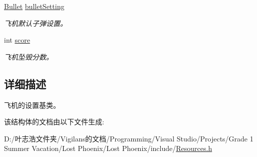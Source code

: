 \begin{DoxyCompactItemize}
\mbox{\label{struct_settings_1_1_plane_a8416c74c0910b4c7a9da8d633e0c346a}} 
\hyperlink{struct_settings_1_1_bullet}{Bullet} \hyperlink{struct_settings_1_1_plane_a8416c74c0910b4c7a9da8d633e0c346a}{bullet\+Setting}
\begin{DoxyCompactList}\small\item\em 飞机默认子弹设置。 \end{DoxyCompactList}\item 
\mbox{\label{struct_settings_1_1_plane_a20a8861d723406f4d49610804226dd82}} 
int \hyperlink{struct_settings_1_1_plane_a20a8861d723406f4d49610804226dd82}{score}
\begin{DoxyCompactList}\small\item\em 飞机坠毁分数。 \end{DoxyCompactList}\end{DoxyCompactItemize}


\subsection{详细描述}
飞机的设置基类。 



该结构体的文档由以下文件生成\+:\begin{DoxyCompactItemize}
\item 
D\+:/叶志浩文件夹/\+Vigilans的文档/\+Programming/\+Visual Studio/\+Projects/\+Grade 1 Summer Vacation/\+Lost Phoenix/\+Lost Phoenix/include/\hyperlink{_resources_8h}{Resources.\+h}\end{DoxyCompactItemize}
